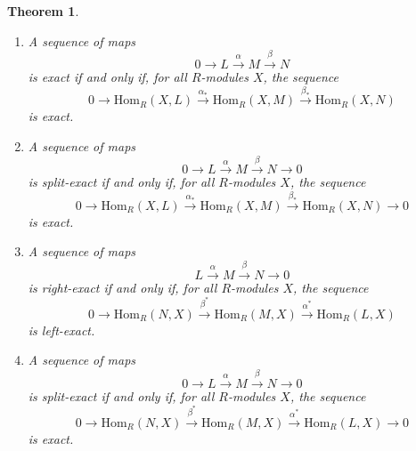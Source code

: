 \documentclass{amsart}[12pt]
\newcommand{\Hom}{\mathrm{Hom}}
\numberwithin{equation}{section}
\theoremstyle{plain} %
\newtheorem{thm}[equation]{Theorem}
\theoremstyle{definition}
\theoremstyle{remark}
\newcommand{\xra}[1]{\xrightarrow{#1}}
\begin{document}
\begin{thm}
	\begin{enumerate}
		 \item	A sequence of maps \[ 0 \to L \xrightarrow{\alpha} M \xrightarrow{\beta} N\]
		is exact if and only if, for all $R$-modules $X$, the sequence
		\[ 0 \to \Hom_R(X,L) \xrightarrow{\alpha_*} \Hom_R(X,M) \xrightarrow{\beta_*} \Hom_R(X,N)  \]
		is exact.
		\item A sequence of maps \[ 0 \to L \xra{\alpha} M \xra{\beta} N \to 0\] is split-exact if and only if, for all $R$-modules $X$, the sequence
		\[ 0 \to \Hom_R(X,L) \xrightarrow{\alpha_*} \Hom_R(X,M) \xrightarrow{\beta_*} \Hom_R(X,N) \to 0 \]
		is exact.

\item	A sequence of maps \[ L \xrightarrow{\alpha} M \xrightarrow{\beta} N \to 0 \]
is right-exact if and only if, for all $R$-modules $X$, the sequence
\[ 0 \to \Hom_R(N,X) \xrightarrow{\beta^*} \Hom_R(M,X) \xrightarrow{\alpha^*} \Hom_R(L,X)  \]
is left-exact.
\item A sequence of maps \[ 0 \to L \xra{\alpha} M \xra{\beta} N \to 0\] is split-exact if and only if, for all $R$-modules $X$, the sequence
\[ 0 \to \Hom_R(N,X) \xrightarrow{\beta^*} \Hom_R(M,X) \xrightarrow{\alpha^*} \Hom_R(L,X) \to 0 \]
is exact.
\end{enumerate}
\end{thm}
\end{document}
